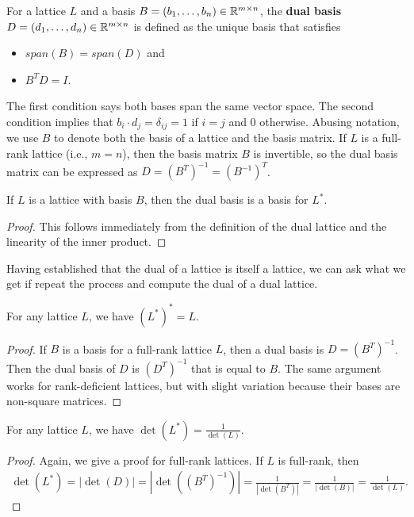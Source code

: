 \documentclass[../main.tex]{subfiles}
\begin{document}
\begin{definition}
\reversemarginpar
{}
For a lattice $L$ and a basis $B=(b_1, \dots, b_n) \in \mathbb{R}^{m \times n}$, the \textbf{dual basis}  $D=(d_1, \dots, d_n) \in \mathbb{R}^{m \times n}$ is defined as the unique basis that satisfies 
\begin{itemize}
    \item $span(B)=span(D)$ and 
    \item $B^T D = I$.
\end{itemize}
\end{definition}
The first condition says both bases span the same vector space. The second condition implies that $b_i \cdot d_j = \delta_{ij}=1$ if $i=j$ and 0 otherwise. Abusing notation, we use $B$ to denote both the basis of a lattice and the basis matrix. If $L$ is a full-rank lattice (i.e., $m=n$), then the basis matrix $B$ is invertible, so the dual basis matrix can be expressed as $D=(B^T)^{-1} = (B^{-1})^T$.

\begin{proposition}
If $L$ is a lattice with basis $B$, then the dual basis is a basis for $L^*$.
\end{proposition}
\begin{proof}
This follows immediately from the definition of the dual lattice and the linearity of the inner product.
\end{proof}

Having established that the dual of a lattice is itself a lattice, we can ask what we get if repeat the process and compute the dual of a dual lattice.
\begin{proposition}
For any lattice $L$, we have $(L^*)^*=L$.
\end{proposition}
\begin{proof}
If $B$ is a basis for a full-rank lattice $L$, then a dual basis is $D=(B^T)^{-1}$. Then the dual basis of $D$ is $(D^T)^{-1}$ that is equal to $B$. The same argument works for rank-deficient lattices, but with slight variation because their bases are non-square matrices. 
\end{proof}

\begin{proposition}
For any lattice $L$, we have $\det(L^*) = \frac{1}{\det(L)}$.
\end{proposition}
\begin{proof}
Again, we give a proof for full-rank lattices. If $L$ is full-rank, then 
\begin{align*}
    \det(L^*) = |\det (D)| = |\det ((B^T)^{-1})| = \frac{1}{|\det (B^T)|} = \frac{1}{|\det (B)|}=\frac{1}{\det (L)}.
\end{align*}
\end{proof}
\end{document}
